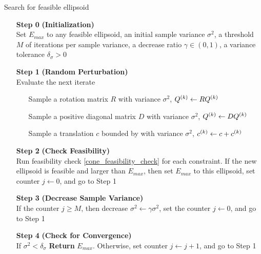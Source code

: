 {
\begin{fullwidth}[leftmargin=0in, rightmargin=0in, width=\linewidth-0.25in]
\begin{flushleft}

\begin{algorithm}[H]
    \caption{Search for feasible ellipsoid}
    \label{numerical_ellipsoid_algorithm}
    \begin{itemize}
        \item[\textbf{Step 0}] \textbf{(Initialization)} \\
                Set $E_{max}$ to any feasible ellipsoid, 
                an initial sample variance $\sigma^2$, 
                a threshold $M$ of iterations per sample variance, 
                a decrease ratio $\gamma \in (0, 1)$, 
                a variance tolerance $\delta_{\sigma} > 0$
        
        \item[\textbf{Step 1}] \textbf{(Random Perturbation)} \\
            Evaluate the next iterate \begin{itemize}
                \item[] Sample a rotation matrix $R$ with variance $\sigma^2$, ${Q^{(k)}} \gets R {Q^{(k)}}$
                \item[] Sample a positive diagonal matrix $D$ with variance $\sigma^2$, ${Q^{(k)}} \gets D {Q^{(k)}}$
                \item[] Sample a translation $c$ bounded by with variance $\sigma^2$, $c^{(k)} \gets c + c^{(k)}$
            \end{itemize}
        
        \item[\textbf{Step 2}] \textbf{(Check Feasibility)} \\
            Run feasibility check \cref{cone_feasibility_check} for each constraint.
            If the new ellipsoid is feasible and larger than $E_{max}$, then 
            	set $E_{max}$ to this ellipsoid,
            	set counter $j \gets 0$, and
            	go to Step 1
        
        \item[\textbf{Step 3}] \textbf{(Decrease Sample Variance)} \\
            If the counter $j \ge M$, then
	    	decrease $\sigma^2 \gets \gamma \sigma^2$,
	    	set the counter $j\gets 0$, and
	    	go to Step 1
            
        \item[\textbf{Step 4}] \textbf{(Check for Convergence)} \\
	    If $\sigma^2 < \delta_{\sigma}$ \textbf{Return} $E_{max}$.
	    Otherwise, 
        		set counter $j \gets j + 1$, and
        		go to Step 1
    \end{itemize}
\end{algorithm}

\end{flushleft}
\end{fullwidth}
}

